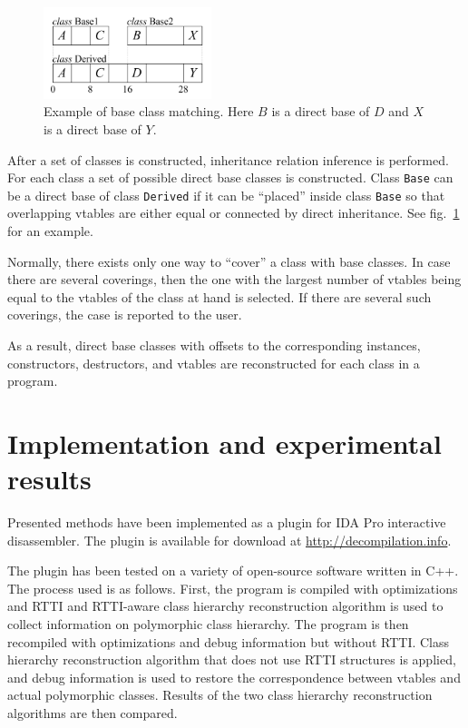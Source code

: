 \documentclass[10pt, conference]{IEEEtran}
\begin{document}
\begin{figure}[tb!]
\centering
  \includegraphics[width=4.9cm]{images/multiple}
\caption{Example of base class matching. Here $B$ is a direct base of $D$ and $X$ is a direct base of $Y$.}
\label{fig:multiple}
\end{figure}

After a set of classes is constructed, inheritance relation inference
is performed.
For each class a set of possible direct base classes is constructed.
Class \lstinline{Base} can be a direct base of class \lstinline{Derived}
if it can be ``placed'' inside class \lstinline{Base} so that overlapping
vtables are either equal or connected by direct inheritance.
See fig.~\ref{fig:multiple} for an example.

Normally, there exists only one way to ``cover'' a class with
base classes. In case there are several coverings, then the one with
the largest number of vtables being equal to the vtables of the
class at hand is selected. If there are several such coverings,
the case is reported to the user. %

As a result,
direct base classes with offsets to the corresponding instances,
constructors, destructors, and vtables
are reconstructed for each class in a program.





\section{Implementation and experimental results}\label{sectionExperiments}
Presented methods have been implemented as a plugin
for IDA Pro interactive disassembler. The plugin is available for
download at \url{http://decompilation.info}.

The plugin has been tested on a variety of open-source software written in C++.
The process used is as follows.
First, the program is compiled with optimizations and RTTI and
RTTI-aware class hierarchy reconstruction algorithm is used to collect information
on polymorphic class hierarchy.
The program is then recompiled with optimizations and debug information but without RTTI.
Class hierarchy reconstruction algorithm that does not use RTTI structures is applied, and
debug information is used to restore the correspondence between vtables and actual polymorphic classes.
Results of the two class hierarchy reconstruction algorithms are then compared.
\end{document}
